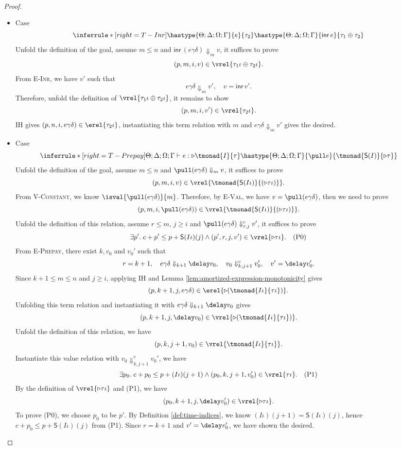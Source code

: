 \begin{proof}
\begin{itemize}
\item Case
\[
  \inferrule*[right=T-Inr]
        {\hastype{\Theta;\Delta;\Omega;\Gamma}{e}{\tau_2}}
        {\hastype{\Theta;\Delta;\Omega;\Gamma}{\mathsf{inr}\,e}{\tau_1\oplus\tau_2}}
\]
Unfold the definition of the goal, assume $m\leq n$ and
$\mathsf{inr}\,(e\gamma\delta)\Downarrow_m v$, it suffices to prove
\[(p, m, i, v)\in\vrel{\tau_1\iota\oplus\tau_2\iota}.\]
From \textsc{E-Inr}, we have $v'$ such that
\[
  e\gamma\delta\Downarrow_m v', \quad v=\mathsf{inr}\,v'.
\]
Therefore, unfold the definition of $\vrel{\tau_1\iota\oplus\tau_2\iota}$, it remains to show
\[(p, m, i, v') \in \vrel{\tau_2\iota}.\]
IH gives $(p, n, i, e\gamma\delta) \in \erel{\tau_2\iota}$, instantiating this
term relation with $m$ and $e\gamma\delta\Downarrow_m v'$ gives the desired.

\item Case
\[
  \inferrule*[right=T-Prepay]
        {\Theta;\Delta;\Omega;\Gamma\vdash e : \triangleright \tmonad{ I}{\tau}}
        {\hastype{\Theta;\Delta;\Omega;\Gamma}{\pull e}{\tmonad{\mathsf{S}( I)}{\triangleright \tau}}}
\]
Unfold the definition of the goal, assume $m\leq n$ and
$\pull(e\gamma\delta)\Downarrow_m v$, it suffices to prove
\[(p, m, i, v)\in\vrel{\tmonad{\mathsf{S}(I\iota)}{(\triangleright\tau\iota)}}.\]
From \textsc{V-Constant}, we know $\isval{\pull(e\gamma\delta)}{m}$.
Therefore, by \textsc{E-Val}, we have $v = \pull(e\gamma\delta)$, then we need to prove
\[(p, m, i, \pull(e\gamma\delta))\in\vrel{\tmonad{\mathsf{S}(I\iota)}{(\triangleright\tau\iota)}}.\]
Unfold the definition of this relation, assume $r\leq m$, $j\geq i$ and
$\pull(e\gamma\delta)\Downarrow^c_{r,j}v'$, it suffices to prove
\[\exists p'.\;c+p' \leq p+\mathsf{S}(I\iota)(j) \land (p', r, j, v')\in\vrel{\triangleright\tau\iota}. \quad (\text{P0})\]
From \textsc{E-Prepay}, there exist $k, v_0$ and $v_0'$ such that
\[
  r = k+1, \quad
  e\gamma\delta\Downarrow_{k+1}\delay v_0,
  \quad
  v_0 \Downarrow^c_{k,j+1}v_0',
  \quad
  v' = \delay v_0'.
\]
Since $k+1 \leq m\leq n$ and $j\geq i$, applying IH and Lemma \ref{lem:amortized-expression-monotonicity} gives
\[(p, k+1, j, e\gamma\delta) \in \erel{\triangleright(\tmonad{I\iota}{\tau\iota})}.\]
Unfolding this term relation and instantiating it with $e\gamma\delta\Downarrow_{k+1}\delay v_0$ gives
\[(p, k+1, j, \delay v_0)\in\vrel{\triangleright(\tmonad{I\iota}{\tau\iota})}.\]
Unfold the definition of this relation, we have
\[(p, k, j+1, v_0)\in\vrel{\tmonad{I\iota}{\tau\iota}}.\]
Instantiate this value relation with $v_0 \Downarrow^c_{k,j+1}v_0'$, we have
\[\exists p_0.\;c+p_0 \leq p+(I\iota)(j+1) \land (p_0, k, j+1, v_0')\in\vrel{\tau\iota}. \quad (\text{P1})\]
By the definition of $\vrel{\triangleright\tau\iota}$ and (P1), we have
\[(p_0, k+1, j, \delay v_0')\in\vrel{\triangleright\tau\iota}.\]
To prove (P0), we choose $p_0$ to be $p'$. By Definition \ref{def:time-indices}, we know
$(I\iota)(j+1)=\mathsf{S}(I\iota)(j)$, hence $c+p_0 \leq p+\mathsf{S}(I\iota)(j)$ from (P1).
Since $r=k+1$ and $v'=\delay v_0'$, we have shown the desired.


\end{itemize}
\end{proof}
